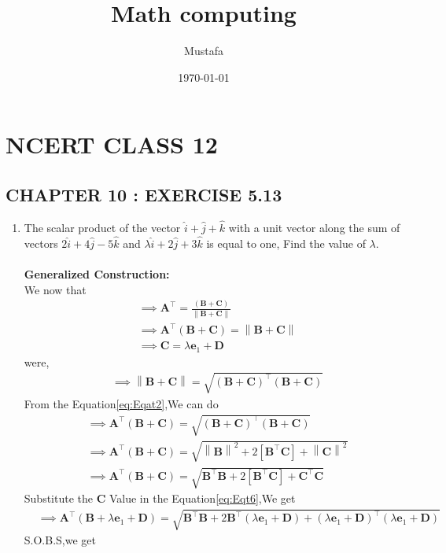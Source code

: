 \documentclass[9pt, a4paper]{article}
\title{ Math computing}
\author{ Mustafa}
\date{\today}
\let\vec\mathbf
\providecommand{\brak}[1]{\ensuremath{\left(#1\right)}}
\providecommand{\sbrak}[1]{\ensuremath{{}\left[#1\right]}}
\providecommand{\norm}[1]{\left\lVert#1\right\rVert}
\begin{document}
\section*{NCERT CLASS 12}
\subsection*{CHAPTER 10 : EXERCISE 5.13}
\begin{enumerate}
\item\textbf{}The scalar product of the vector $\hat{i}+\hat{j}+\hat{k}$ with a unit vector along the sum of vectors $2\hat{i}+4\hat{j}-5\hat{k}$ and $\lambda\hat{i}+2\hat{j}+3\hat{k}$ is equal to one, Find the value of $\lambda$.
\\\\
\textbf{Generalized Construction:}\\
We now that \\
\begin{align}
   &\implies \vec{A}^\top = \frac{\brak{\vec{B}+\vec{C}}}{\norm{\vec{B}+\vec{C}}}\\
       &\implies \vec{A}^\top \brak{\vec{B}+\vec{C}}=\norm{\vec{B}+\vec{C}} \label{eq:Eqat2}\\
       &\implies \vec{C}=\lambda\vec{e}_1+\vec{D}\label{eq:EQT-C}
    \end{align}
    were,
    \begin{align}
       &\implies \norm{\vec{B}+\vec{C}}= \sqrt{\brak{\vec{B}+\vec{C}}^\top\brak{\vec{B}+\vec{C}}}
    \end{align}
From the Equation\eqref{eq:Eqat2},We can do
\begin{align}
   &\implies \vec{A}^\top \brak{\vec{B}+\vec{C}}=\sqrt{\brak{\vec{B}+\vec{C}}^\top\brak{\vec{B}+\vec{C}}}\\
&\implies \vec{A}^\top \brak{\vec{B}+\vec{C}}=\sqrt{\norm{\vec{B}}^2+2\sbrak{\vec{B}^{\top}\vec{C}}+\norm{\vec{C}}^2}\\
&\implies \vec{A}^\top \brak{\vec{B}+\vec{C}}=\sqrt{{\vec{B}^{\top}\vec{B}}+2\sbrak{\vec{B}^{\top}\vec{C}}+{\vec{C}^\top\vec{C}}}\label{eq:Eqt6}
\end{align}
Substitute the $\vec{C}$ Value in the Equation\eqref{eq:Eqt6},We get
\begin{align}
&\implies\vec{A}^{\top}\brak{\vec{B}+\lambda\vec{e}_1+\vec{D}}=\sqrt{\vec{B}^{\top}\vec{B}+2\vec{B}^{\top}\brak{\lambda\vec{e}_1+\vec{D}}+\brak{\lambda\vec{e}_1+\vec{D}}^{\top}\brak{\lambda\vec{e}_1+\vec{D}}}
\end{align}
S.O.B.S,we get
\begin{align}

\end{align}
\end{enumerate}
\end{document}
